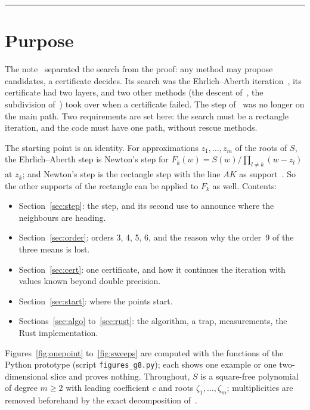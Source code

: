 \documentclass[10pt,a4paper]{article}
\theoremstyle{definition}
\numberwithin{equation}{section}
\begin{document}
\vspace{4pt}\hrule

\section{Purpose}
The note~\cite{g7} separated the search from the proof: any method may propose candidates, a
certificate decides. Its search was the Ehrlich--Aberth iteration~\cite{ehrlich,aberth}, its
certificate had two layers, and two other methods (the descent of~\cite{g3}, the subdivision
of~\cite{g6}) took over when a certificate failed. The step of~\cite{v29,g2} was no longer on the
main path. Two requirements are set here: the search must be a rectangle iteration, and the code must
have one path, without rescue methods.

The starting point is an identity. For approximations $z_1,\dots,z_m$ of the roots of $S$, the
Ehrlich--Aberth step is Newton's step for $F_k(w)=S(w)/\prod_{l\ne k}(w-z_l)$ at $z_k$; and Newton's
step is the rectangle step with the line $AK$ as support~\cite{v29,g2}. So the other supports of the
rectangle can be applied to $F_k$ as well. Contents:
\begin{itemize}
\item Section~\ref{sec:step}: the step, and its second use to announce where the neighbours are
 heading.
\item Section~\ref{sec:order}: orders 3, 4, 5, 6, and the reason why the order~9 of the three means
 is lost.
\item Section~\ref{sec:cert}: one certificate, and how it continues the iteration with values known
 beyond double precision.
\item Section~\ref{sec:start}: where the points start.
\item Sections~\ref{sec:algo} to~\ref{sec:rust}: the algorithm, a trap, measurements, the Rust
 implementation.
\end{itemize}
Figures~\ref{fig:onepoint} to~\ref{fig:sweeps} are computed with the functions of the Python prototype
(script \texttt{figures\_g8.py}); each shows one example or one two-dimensional slice and proves nothing.
Throughout, $S$ is a square-free polynomial of degree $m\ge2$ with leading coefficient $c$ and roots
$\zeta_1,\dots,\zeta_m$; multiplicities are removed beforehand by the exact decomposition
of~\cite{g5,g6}.
\end{document}
